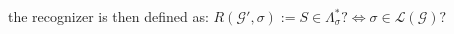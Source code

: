 \documentclass[portrait,a0b,final,a4resizeable]{a0poster}
\def\jointspacing{\vspace{0.3in}}
\begin{document}
\begin{poster}
\begin{multicols}{2}
{      \vspace{1cm}\null\hspace*{3cm}\begin{minipage}[c]{0.90\columnwidth}
        the recognizer is then defined as: $R(\mathcal{G}', \sigma) := S \in \Lambda^*_\sigma? \Longleftrightarrow \sigma \in \mathcal{L}(\mathcal{G})?$
      \end{minipage}
      }

      \jointspacing



\end{multicols}
\end{poster}
\end{document}
